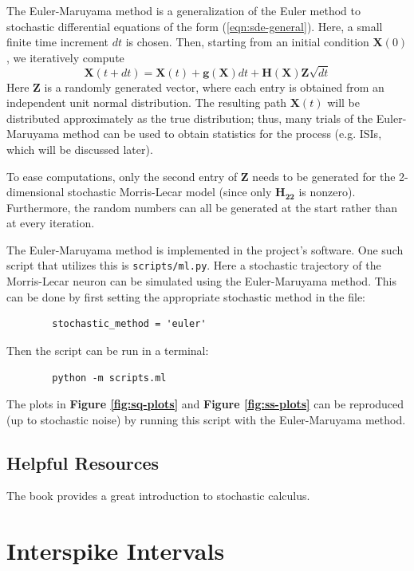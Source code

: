 \documentclass[letterpaper,12pt]{article}
\numberwithin{table}{section}
\numberwithin{figure}{section}
\numberwithin{equation}{section}
\newcommand{\reffig}[1]{\textbf{Figure \ref{#1}}}
\begin{document}
\begin{flushleft}
    The Euler-Maruyama method is a generalization of the Euler method to stochastic differential equations of the form (\ref{eqn:sde-general}). Here, a small finite time increment $dt$ is chosen. Then, starting from an initial condition $\mathbf{X}(0)$, we iteratively compute
    \begin{equation}
        \mathbf{X}(t + dt) = \mathbf{X}(t) + \mathbf{g}(\mathbf{X}) dt + \mathbf{H}(\mathbf{X}) \mathbf{Z} \sqrt{dt}
    \end{equation}
    Here $\mathbf{Z}$ is a randomly generated vector, where each entry is obtained from an independent unit normal distribution. The resulting path $\mathbf{X}(t)$ will be distributed approximately as the true distribution; thus, many trials of the Euler-Maruyama method can be used to obtain statistics for the process (e.g. ISIs, which will be discussed later).

    To ease computations, only the second entry of $\mathbf{Z}$ needs to be generated for the 2-dimensional stochastic Morris-Lecar model (since only $\mathbf{H_{22}}$ is nonzero). Furthermore, the random numbers can all be generated at the start rather than at every iteration.

    The Euler-Maruyama method is implemented in the project's software. One such script that utilizes this is \texttt{scripts/ml.py}. Here a stochastic trajectory of the Morris-Lecar neuron can be simulated using the Euler-Maruyama method. This can be done by first setting the appropriate stochastic method in the file:
    \begin{lstlisting}
        stochastic_method = 'euler'
    \end{lstlisting}
    Then the script can be run in a terminal:
    \begin{lstlisting}
        python -m scripts.ml
    \end{lstlisting}
    The plots in \reffig{fig:sq-plots} and \reffig{fig:ss-plots} can be reproduced (up to stochastic noise) by running this script with the Euler-Maruyama method.

    \subsection{Helpful Resources}
    The book \cite{finbook} provides a great introduction to stochastic calculus.

    \pagebreak

    \section{Interspike Intervals}


\end{flushleft}
\end{document}

